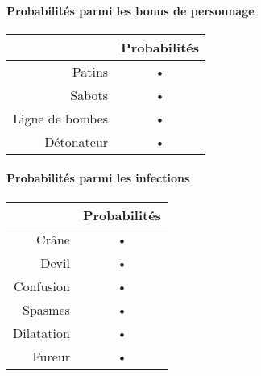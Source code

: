 \paragraph{Probabilités parmi les bonus de personnage}
\begin{center}
\begin{tabular}{|r|c|}
\hline 
& Probabilités \\ 
\hline 
Patins & • \\ 
\hline 
Sabots & • \\ 
\hline 
Ligne de bombes & • \\ 
\hline 
Détonateur & • \\ 
\hline 
\end{tabular} 
\end{center}

\paragraph{Probabilités parmi les infections}
\begin{center}
\begin{tabular}{|r|c|}
\hline 
& Probabilités \\ 
\hline 
Crâne & • \\ 
\hline 
Devil & • \\ 
\hline 
Confusion & • \\ 
\hline 
Spasmes & • \\ 
\hline 
Dilatation & • \\ 
\hline 
Fureur & • \\ 
\hline 
\end{tabular} 
\end{center}